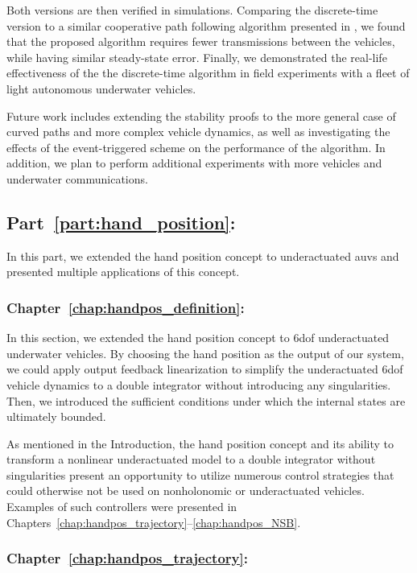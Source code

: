 Both versions are then verified in simulations.
Comparing the discrete-time version to a similar cooperative path following algorithm presented in \cite{praveen_cooperative_2018}, we found 
that the proposed algorithm requires fewer transmissions between the vehicles, while having similar steady-state error.
Finally, we demonstrated the real-life effectiveness of the the discrete-time algorithm in field experiments with a fleet of light autonomous underwater vehicles.

Future work includes extending the stability proofs to the more general case of curved paths and more complex vehicle dynamics, as well as investigating the effects of the event-triggered scheme on the performance of the algorithm.
In addition, we plan to perform additional experiments with more vehicles and underwater communications.

\subsection*{Part~\ref{part:hand_position}: }

In this part, we extended the hand position concept to underactuated \glspl{auv} and presented multiple applications of this concept.

\subsubsection{Chapter~\ref{chap:handpos_definition}: }

In this section, we extended the hand position concept to 6\gls{dof} underactuated underwater vehicles.
By choosing the hand position as the output of our system, we could apply output feedback linearization to simplify the underactuated 6\gls{dof} vehicle dynamics to a double integrator without introducing any singularities.
Then, we introduced the sufficient conditions under which the internal states are ultimately bounded.

As mentioned in the Introduction, the hand position concept and its ability to transform a nonlinear underactuated model to a double integrator without singularities present an opportunity to utilize numerous control strategies that could otherwise not be used on nonholonomic or underactuated vehicles.
Examples of such controllers were presented in Chapters~\ref{chap:handpos_trajectory}--\ref{chap:handpos_NSB}.

\subsubsection{Chapter~\ref{chap:handpos_trajectory}: }

